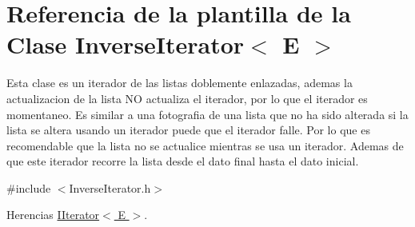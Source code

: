 \hypertarget{classInverseIterator}{\section{Referencia de la plantilla de la Clase Inverse\-Iterator$<$ E $>$}
\label{classInverseIterator}
}


Esta clase es un iterador de las listas doblemente enlazadas, ademas la actualizacion de la lista N\-O actualiza el iterador, por lo que el iterador es momentaneo. Es similar a una fotografia de una lista que no ha sido alterada si la lista se altera usando un iterador puede que el iterador falle. Por lo que es recomendable que la lista no se actualice mientras se usa un iterador. Ademas de que este iterador recorre la lista desde el dato final hasta el dato inicial.  




{\ttfamily \#include $<$Inverse\-Iterator.\-h$>$}



Herencias \hyperlink{classIIterator}{I\-Iterator$<$ E $>$}.

